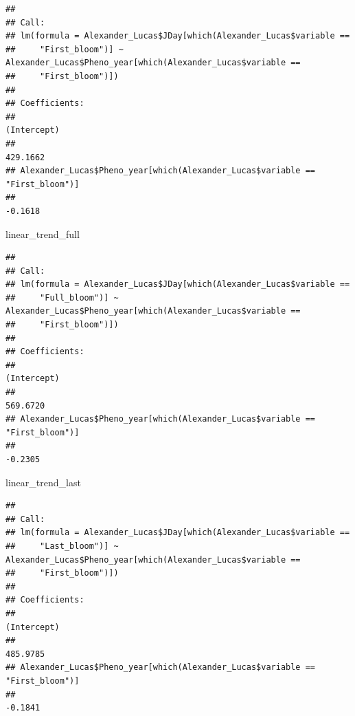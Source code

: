 \documentclass[
]{book}
\newenvironment{Shaded}{\begin{snugshade}}{\end{snugshade}}
\newcommand{\NormalTok}[1]{#1}
\begin{document}
\begin{verbatim}
## 
## Call:
## lm(formula = Alexander_Lucas$JDay[which(Alexander_Lucas$variable == 
##     "First_bloom")] ~ Alexander_Lucas$Pheno_year[which(Alexander_Lucas$variable == 
##     "First_bloom")])
## 
## Coefficients:
##                                                                  (Intercept)  
##                                                                     429.1662  
## Alexander_Lucas$Pheno_year[which(Alexander_Lucas$variable == "First_bloom")]  
##                                                                      -0.1618
\end{verbatim}

\begin{Shaded}
\begin{Highlighting}[]
\NormalTok{linear_trend_full}
\end{Highlighting}
\end{Shaded}

\begin{verbatim}
## 
## Call:
## lm(formula = Alexander_Lucas$JDay[which(Alexander_Lucas$variable == 
##     "Full_bloom")] ~ Alexander_Lucas$Pheno_year[which(Alexander_Lucas$variable == 
##     "First_bloom")])
## 
## Coefficients:
##                                                                  (Intercept)  
##                                                                     569.6720  
## Alexander_Lucas$Pheno_year[which(Alexander_Lucas$variable == "First_bloom")]  
##                                                                      -0.2305
\end{verbatim}

\begin{Shaded}
\begin{Highlighting}[]
\NormalTok{linear_trend_last}
\end{Highlighting}
\end{Shaded}

\begin{verbatim}
## 
## Call:
## lm(formula = Alexander_Lucas$JDay[which(Alexander_Lucas$variable == 
##     "Last_bloom")] ~ Alexander_Lucas$Pheno_year[which(Alexander_Lucas$variable == 
##     "First_bloom")])
## 
## Coefficients:
##                                                                  (Intercept)  
##                                                                     485.9785  
## Alexander_Lucas$Pheno_year[which(Alexander_Lucas$variable == "First_bloom")]  
##                                                                      -0.1841
\end{verbatim}
\end{document}
